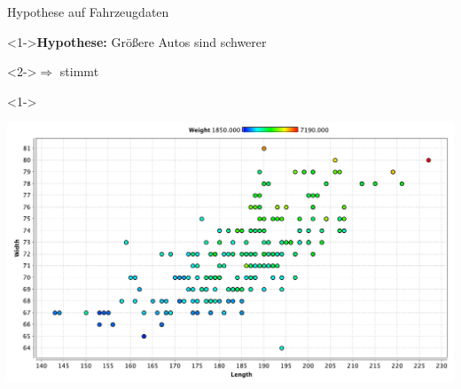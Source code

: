 \documentclass{beamer}
\begin{document}
\begin{frame}{Hypothese auf Fahrzeugdaten}
\begin{onlyenv}<1->\textbf{Hypothese:} Größere Autos sind schwerer\end{onlyenv} \begin{onlyenv}<2->$\Rightarrow$ stimmt\end{onlyenv}
\begin{onlyenv}<1->\begin{center}
\includegraphics[width=1\linewidth]{U1_Length_Width_Weight.pdf}
\end{center}
\end{onlyenv}
\end{frame}
\end{document}
